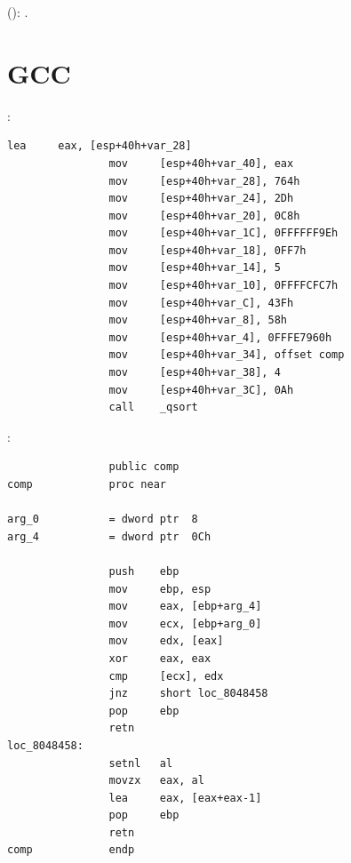   \AndENRU 
{}  
(): 
 \comp {}.

\section{GCC}

:

\begin{lstlisting}[caption=GCC]
                lea     eax, [esp+40h+var_28]
                mov     [esp+40h+var_40], eax
                mov     [esp+40h+var_28], 764h
                mov     [esp+40h+var_24], 2Dh
                mov     [esp+40h+var_20], 0C8h
                mov     [esp+40h+var_1C], 0FFFFFF9Eh
                mov     [esp+40h+var_18], 0FF7h
                mov     [esp+40h+var_14], 5
                mov     [esp+40h+var_10], 0FFFFCFC7h
                mov     [esp+40h+var_C], 43Fh
                mov     [esp+40h+var_8], 58h
                mov     [esp+40h+var_4], 0FFFE7960h
                mov     [esp+40h+var_34], offset comp
                mov     [esp+40h+var_38], 4
                mov     [esp+40h+var_3C], 0Ah
                call    _qsort
\end{lstlisting}

:

\begin{lstlisting}
                public comp
comp            proc near

arg_0           = dword ptr  8
arg_4           = dword ptr  0Ch

                push    ebp
                mov     ebp, esp
                mov     eax, [ebp+arg_4]
                mov     ecx, [ebp+arg_0]
                mov     edx, [eax]
                xor     eax, eax
                cmp     [ecx], edx
                jnz     short loc_8048458
                pop     ebp
                retn
loc_8048458:
                setnl   al
                movzx   eax, al
                lea     eax, [eax+eax-1]
                pop     ebp
                retn
comp            endp
\end{lstlisting}

